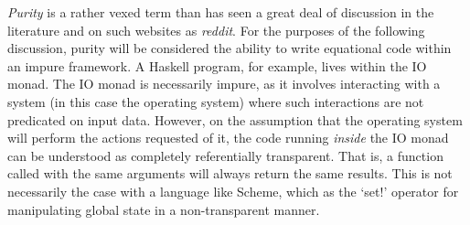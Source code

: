 \documentclass[12pt, a4paper]{report}
\begin{document}

\textit{Purity} is a rather vexed term than has seen a great deal of discussion in the literature
and on such websites as \textit{reddit}. For the purposes of the following discussion, purity will
be considered the ability to write equational code within an impure framework. A Haskell program,
for example, lives within the IO monad. The IO monad is necessarily impure, as it involves
interacting with a system (in this case the operating system) where such interactions are not
predicated on input data. However, on the assumption that the operating system will perform the
actions requested of it, the code running \textit{inside} the IO monad can be understood as
completely referentially transparent. That is, a function called with the same arguments will always
return the same results. This is not necessarily the case with a language like Scheme, which as the
`set!' operator for manipulating global state in a non-transparent manner. 
\end{document}
